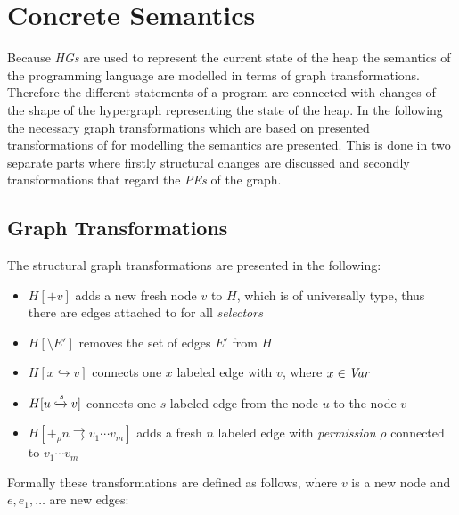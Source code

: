 \section{Concrete Semantics}
	Because \emph{\acp{HG}} are used to represent the current state of the heap
	the semantics of the programming language are modelled in
	terms of graph transformations. Therefore the different statements of a
	program are connected with changes of the shape of the hypergraph
	representing the state of the heap. In the following the necessary graph
	transformations which are based on presented transformations of \cite{fmsd}
	for modelling the semantics are presented. This is done in two separate
	parts where firstly structural changes are discussed and secondly
	transformations that regard the \emph{\acp{PE}} of the graph.
\subsection{Graph Transformations}
\label{sec:graphtrans}
	The structural graph transformations are presented in the following:
	\begin{itemize}
		\item $H[+v]$ adds a new fresh node $v$ to $H$, which is of universally
			type, thus there are edges attached to for all \emph{selectors}
		\item $H[\setminus E']$ removes the set of edges $E'$ from $H$
		\item $H[x\hookrightarrow v]$ connects one $x$ labeled edge with $v$,
			where $x\in\mathit{Var}$
		\item $H[u\xhookrightarrow{s} v]$ connects one $s$ labeled edge
			from the node $u$ to the node $v$
		\item $H[+_{\rho}n\rightrightarrows v_1\cdots v_m]$ adds a fresh $n$
			labeled edge with \emph{permission} $\rho$ connected to
			$v_1\cdots v_m$
	\end{itemize}
	Formally these transformations are defined as follows, where $v$ is a new
	node and $e,e_{1},\dots$ are new edges:
